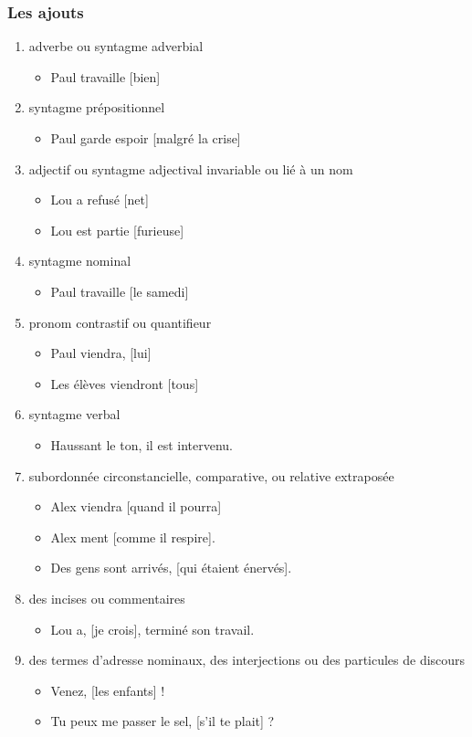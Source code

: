 \documentclass[UTF8]{report}
\begin{document}
\subsubsection{Les ajouts}
\begin{enumerate}
    \item adverbe ou syntagme adverbial
    \begin{itemize}
        \item Paul travaille [bien]
    \end{itemize}
    \item syntagme prépositionnel
    \begin{itemize}
        \item Paul garde espoir [malgré la crise]
    \end{itemize}
    \item adjectif ou syntagme adjectival invariable ou lié à un nom
    \begin{itemize}
        \item Lou a refusé [net]
        \item Lou est partie [furieuse]
    \end{itemize}
    \item syntagme nominal
    \begin{itemize}
        \item Paul travaille [le samedi]
    \end{itemize}
    \item pronom contrastif ou quantifieur
    \begin{itemize}
        \item Paul viendra, [lui]
        \item Les élèves viendront [tous]
    \end{itemize}
    \item syntagme verbal
    \begin{itemize}
        \item Haussant le ton, il est intervenu.
    \end{itemize}
    \item subordonnée circonstancielle, comparative, ou relative extraposée
    \begin{itemize}
        \item Alex viendra [quand il pourra]
        \item Alex ment [comme il respire].
        \item Des gens sont arrivés, [qui étaient énervés].
    \end{itemize}
    \item des incises ou commentaires 
    \begin{itemize}
        \item Lou a, [je crois], terminé son travail.
    \end{itemize}
    \item des termes d’adresse nominaux, des interjections ou des particules de discours
    \begin{itemize}
        \item Venez, [les enfants] !
        \item Tu peux me passer le sel, [s’il te plait] ?
    \end{itemize}
\end{enumerate}
\end{document}
